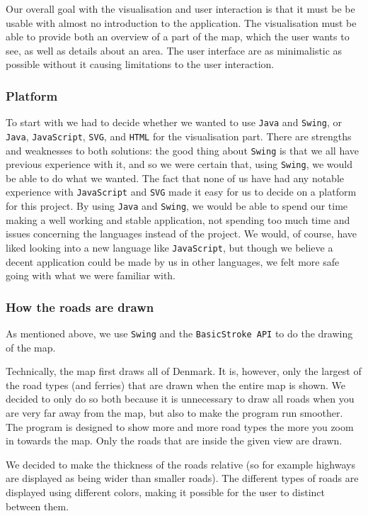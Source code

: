 Our overall goal with the visualisation and user interaction is that it must be be usable with almost no introduction to the application. The visualisation must be able to provide both an overview of a part of the map, which the user wants to see, as well as details about an area. The user interface are as minimalistic as possible without it causing limitations to the user interaction.

\subsubsection{Platform}
To start with we had to decide whether we wanted to use \texttt{Java} and \texttt{Swing}, or \texttt{Java}, \texttt{JavaScript}, \texttt{SVG}, and \texttt{HTML} for the visualisation part. There are strengths and weaknesses to both solutions: the good thing about \texttt{Swing} is that we all have previous experience with it, and so we were certain that, using \texttt{Swing}, we would be able to do what we wanted. 
The fact that none of us have had any notable experience with \texttt{JavaScript} and \texttt{SVG} made it easy for us to decide on a platform for this project. By using \texttt{Java} and \texttt{Swing}, we would be able to spend our time making a well working and stable application, not spending too much time and issues concerning the languages instead of the project. We would, of course, have liked looking into a new language like \texttt{JavaScript}, but though we believe a decent application could be made by us in other languages, we felt more safe going with what we were familiar with.

\subsubsection{How the roads are drawn}
As mentioned above, we use \texttt{Swing} and the \texttt{BasicStroke API} to do the drawing of the map. 

Technically, the map first draws all of Denmark. It is, however, only the largest of the road types (and ferries) that are drawn when the entire map is shown. We decided to only do so both because it is unnecessary to draw all roads when you are very far away from the map, but also to make the program run smoother. The program is designed to show more and more road types the more you zoom in towards the map. Only the roads that are inside the given view are drawn.

We decided to make the thickness of the roads relative (so for example highways are displayed as being wider than smaller roads). The different types of roads are displayed using different colors, making it possible for the user to distinct between them.

